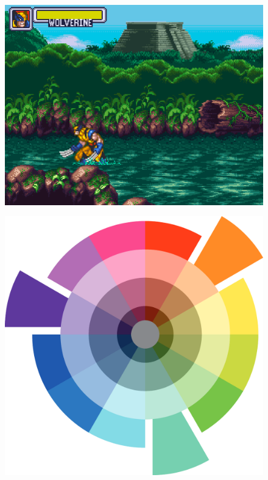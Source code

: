\documentclass[english]{textolivre}
\begin{document}
\begin{figure}[htbp]
\begin{minipage}[t]{0.47\textwidth}
\includegraphics[width=\linewidth]{fig-2a.png}
\label{fig2a}
\end{minipage}
\hfill
\begin{minipage}[t]{0.47\textwidth}
\includegraphics[width=\linewidth]{fig-2b.png}

\end{minipage}
\end{figure}
\end{document}
